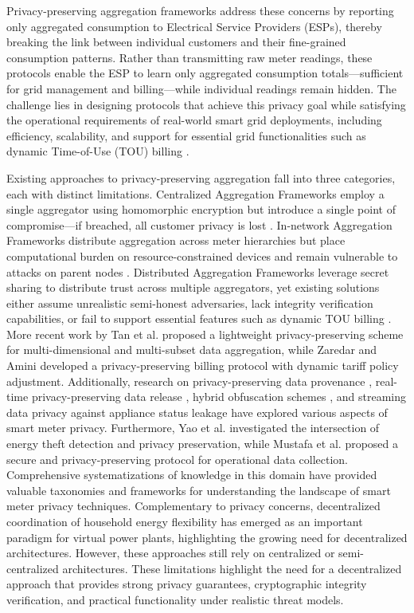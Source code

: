 \documentclass[conference]{IEEEtran}
\begin{document}
Privacy-preserving aggregation frameworks address these concerns by reporting only aggregated consumption to Electrical Service Providers (ESPs), thereby breaking the link between individual customers and their fine-grained consumption patterns. Rather than transmitting raw meter readings, these protocols enable the ESP to learn only aggregated consumption totals—sufficient for grid management and billing—while individual readings remain hidden. The challenge lies in designing protocols that achieve this privacy goal while satisfying the operational requirements of real-world smart grid deployments, including efficiency, scalability, and support for essential grid functionalities such as dynamic Time-of-Use (TOU) billing \cite{ben2022privacy, borges2014privacy, tan2024lppmm, zaredar2024lightweight}.

Existing approaches to privacy-preserving aggregation fall into three categories, each with distinct limitations. Centralized Aggregation Frameworks employ a single aggregator using homomorphic encryption but introduce a single point of compromise—if breached, all customer privacy is lost \cite{ben2022privacy}. In-network Aggregation Frameworks distribute aggregation across meter hierarchies but place computational burden on resource-constrained devices and remain vulnerable to attacks on parent nodes \cite{borges2014privacy}. Distributed Aggregation Frameworks leverage secret sharing to distribute trust across multiple aggregators, yet existing solutions either assume unrealistic semi-honest adversaries, lack integrity verification capabilities, or fail to support essential features such as dynamic TOU billing \cite{rottondi2013distributed}. More recent work by Tan et al. \cite{tan2024lppmm} proposed a lightweight privacy-preserving scheme for multi-dimensional and multi-subset data aggregation, while Zaredar and Amini \cite{zaredar2024lightweight} developed a privacy-preserving billing protocol with dynamic tariff policy adjustment. Additionally, research on privacy-preserving data provenance \cite{parameswarath2024provenance}, real-time privacy-preserving data release \cite{shateri2024realtime}, hybrid obfuscation schemes \cite{tran2024hybrid}, and streaming data privacy against appliance status leakage \cite{hong2018privacy} have explored various aspects of smart meter privacy. Furthermore, Yao et al. \cite{yao2024theft} investigated the intersection of energy theft detection and privacy preservation, while Mustafa et al. \cite{mustafa2023secure} proposed a secure and privacy-preserving protocol for operational data collection. Comprehensive systematizations of knowledge in this domain \cite{behrouz2024privacy} have provided valuable taxonomies and frameworks for understanding the landscape of smart meter privacy techniques. Complementary to privacy concerns, decentralized coordination of household energy flexibility \cite{wang2024decentralized} has emerged as an important paradigm for virtual power plants, highlighting the growing need for decentralized architectures. However, these approaches still rely on centralized or semi-centralized architectures. These limitations highlight the need for a decentralized approach that provides strong privacy guarantees, cryptographic integrity verification, and practical functionality under realistic threat models.
\end{document}
